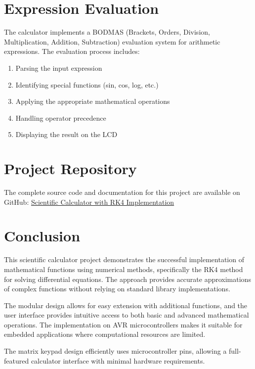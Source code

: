 \documentclass{article}
\begin{document}
\section{Expression Evaluation}
The calculator implements a BODMAS (Brackets, Orders, Division, Multiplication, Addition, Subtraction) evaluation system for arithmetic expressions. The evaluation process includes:

\begin{enumerate}
    \item Parsing the input expression
    \item Identifying special functions (sin, cos, log, etc.)
    \item Applying the appropriate mathematical operations
    \item Handling operator precedence
    \item Displaying the result on the LCD
\end{enumerate}

\section{Project Repository}
The complete source code and documentation for this project are available on GitHub:
\href{https://github.com/yourusername/scientific-calculator-rk4}{Scientific Calculator with RK4 Implementation}

\section{Conclusion}
This scientific calculator project demonstrates the successful implementation of mathematical functions using numerical methods, specifically the RK4 method for solving differential equations. The approach provides accurate approximations of complex functions without relying on standard library implementations.

The modular design allows for easy extension with additional functions, and the user interface provides intuitive access to both basic and advanced mathematical operations. The implementation on AVR microcontrollers makes it suitable for embedded applications where computational resources are limited.

The matrix keypad design efficiently uses microcontroller pins, allowing a full-featured calculator interface with minimal hardware requirements.
\end{document}
